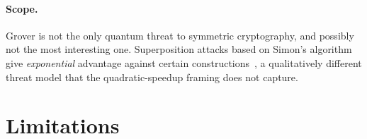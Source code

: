 \documentclass[11pt,a4paper]{article}
\begin{document}
\paragraph{Scope.} Grover is not the only quantum threat to symmetric
cryptography, and possibly not the most interesting one. Superposition attacks
based on Simon's algorithm give \emph{exponential} advantage against certain
constructions~\citep{kuwakado2010,kaplan2016}, a qualitatively different threat
model that the quadratic-speedup framing does not capture.

\section{Limitations}
\label{sec:limitations}
\end{document}
